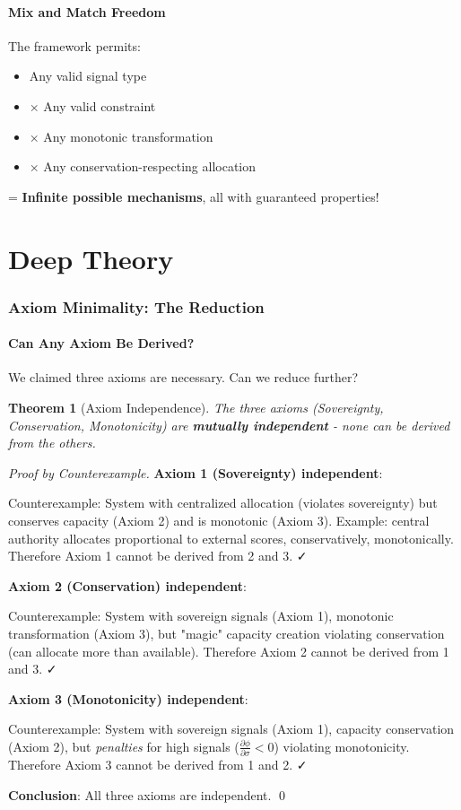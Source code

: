 \documentclass[11pt,a4paper]{article}
\newtheorem{theorem}{Theorem}[section]
\theoremstyle{definition}
\theoremstyle{remark}
\begin{document}
\subsection{Mix and Match Freedom}

The framework permits:
\begin{itemize}
\item Any valid signal type
\item × Any valid constraint
\item × Any monotonic transformation
\item × Any conservation-respecting allocation
\end{itemize}

= \textbf{Infinite possible mechanisms}, all with guaranteed properties!

\part{Deep Theory}

\section{Axiom Minimality: The Reduction}

\subsection{Can Any Axiom Be Derived?}

We claimed three axioms are necessary. Can we reduce further?

\begin{theorem}[Axiom Independence]
The three axioms (Sovereignty, Conservation, Monotonicity) are \textbf{mutually independent} - none can be derived from the others.
\end{theorem}

\begin{proof}[Proof by Counterexample]
\textbf{Axiom 1 (Sovereignty) independent}:

Counterexample: System with centralized allocation (violates sovereignty) but conserves capacity (Axiom 2) and is monotonic (Axiom 3). Example: central authority allocates proportional to external scores, conservatively, monotonically. Therefore Axiom 1 cannot be derived from 2 and 3. ✓

\textbf{Axiom 2 (Conservation) independent}:

Counterexample: System with sovereign signals (Axiom 1), monotonic transformation (Axiom 3), but "magic" capacity creation violating conservation (can allocate more than available). Therefore Axiom 2 cannot be derived from 1 and 3. ✓

\textbf{Axiom 3 (Monotonicity) independent}:

Counterexample: System with sovereign signals (Axiom 1), capacity conservation (Axiom 2), but \textit{penalties} for high signals ($\frac{\partial \phi}{\partial \sigma} < 0$) violating monotonicity. Therefore Axiom 3 cannot be derived from 1 and 2. ✓

\textbf{Conclusion}: All three axioms are independent. \qed
\end{proof}
\end{document}
